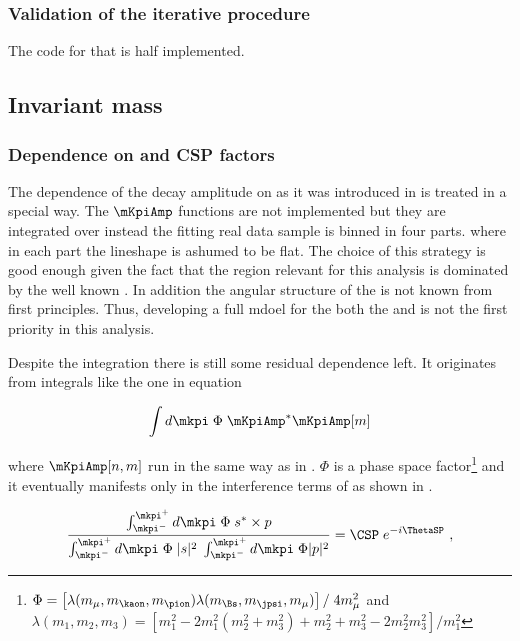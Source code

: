 \subsubsection{Validation of the iterative procedure}
{\color{red} The code for that is half implemented.}

\subsection{\Kpi Invariant mass}
\label{Kpi_Invariant_mass}

\subsubsection{Dependence on \mkpi and CSP factors}
The dependence of the \BJpsiKpi decay amplitude on \mkpi as it was introduced in  is treated in a special way.
The $\mKpiAmp$ functions are not implemented but they are integrated over \mkpi instead the fitting real data sample is binned in four parts.
where in each part the \mkpi lineshape is ashumed to be flat.
The choice of this strategy is good enough given the fact that the \mkpi region relevant for this analysis is dominated by the well
known \pwave. In addition the angular structure of the \swave is not known from first principles. Thus, developing a full mdoel for the both
the \pwave and \swave is not the first priority in this analysis.

Despite the \mkpi integration there is still some residual dependence left. It originates from integrals
like the one in equation 

\begin{equation}
  \label{spIntegrals}
  \int d\mkpi \; \Phi \; \mKpiAmp^* \mKpiAmp[m]
\end{equation}

\noindent where $\mKpiAmp[n,m]$ run in the same way as in . $\Phi$ is a phase space 
factor\footnote{$\Phi = \left[ \lambda(m_\mu,m_\kaon,m_\pion) \lambda(m_{\Bs},m_\jpsi,m_\mu) \right] / \; 4 m_\mu^2$  and \\ 
$\lambda(m_1,m_2,m_3) = \left[ m_1^2 - 2m_1^2(m_2^2 + m_3^2) + m_2^2 + m_3^2 - 2m_2^2m_3^2 \right] / m_1^2 $  
} and it eventually manifests only in the \spwave interference terms of  as shown
in .

\begin{equation}
  \label{csp_def}
  \frac{\int_{\mkpi^-}^{\mkpi^+} d\mkpi \; \Phi \; s^* \times p} {\int_{\mkpi^-}^{\mkpi^+} d\mkpi \; \Phi \; |s|^2 \; \int_{\mkpi^-}^{\mkpi^+} d\mkpi \; \Phi |p|^2} = \CSP \; e^{-i\ThetaSP} \ ,
\end{equation}

